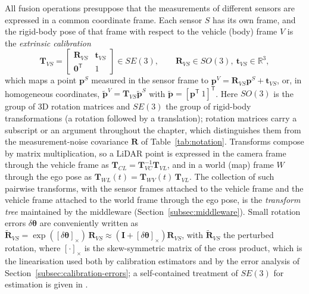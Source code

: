 \documentclass[graybox,envcountchap]{style/SNmono}
\begin{document}
All fusion operations presuppose that the measurements of different sensors are expressed in a common coordinate frame. Each sensor $S$ has its own frame, and the rigid-body pose of that frame with respect to the vehicle (body) frame $V$ is the \emph{extrinsic calibration}
\begin{equation}
\mathbf{T}_{V\!S}=
\begin{bmatrix}
\mathbf{R}_{V\!S} & \mathbf{t}_{V\!S}\\
\mathbf{0}^{\mathsf T} & 1
\end{bmatrix}\in SE(3),
\qquad
\mathbf{R}_{V\!S}\in SO(3),\ \mathbf{t}_{V\!S}\in\mathbb{R}^{3},
\label{eq:extrinsic-se3}
\end{equation}
which maps a point $\mathbf{p}^{S}$ measured in the sensor frame to $\mathbf{p}^{V}=\mathbf{R}_{V\!S}\mathbf{p}^{S}+\mathbf{t}_{V\!S}$, or, in homogeneous coordinates, $\tilde{\mathbf{p}}^{V}=\mathbf{T}_{V\!S}\tilde{\mathbf{p}}^{S}$ with $\tilde{\mathbf{p}}=[\mathbf{p}^{\mathsf T}\ 1]^{\mathsf T}$. Here $SO(3)$ is the group of 3D rotation matrices and $SE(3)$ the group of rigid-body transformations (a rotation followed by a translation); rotation matrices carry a subscript or an argument throughout the chapter, which distinguishes them from the measurement-noise covariance $\mathbf{R}$ of Table~\ref{tab:notation}. Transforms compose by matrix multiplication, so a LiDAR point is expressed in the camera frame through the vehicle frame as $\mathbf{T}_{C\!L}=\mathbf{T}_{V\!C}^{-1}\mathbf{T}_{V\!L}$, and in a world (map) frame $W$ through the ego pose as $\mathbf{T}_{W\!L}(t)=\mathbf{T}_{W\!V}(t)\,\mathbf{T}_{V\!L}$. The collection of such pairwise transforms, with the sensor frames attached to the vehicle frame and the vehicle frame attached to the world frame through the ego pose, is the \emph{transform tree} maintained by the middleware (Section~\ref{subsec:middleware}). Small rotation errors $\delta\boldsymbol{\theta}$ are conveniently written as $\widetilde{\mathbf{R}}_{V\!S}=\exp([\delta\boldsymbol{\theta}]_{\times})\,\mathbf{R}_{V\!S}\approx(\mathbf{I}+[\delta\boldsymbol{\theta}]_{\times})\mathbf{R}_{V\!S}$, with $\widetilde{\mathbf{R}}_{V\!S}$ the perturbed rotation, where $[\cdot]_{\times}$ is the skew-symmetric matrix of the cross product, which is the linearisation used both by calibration estimators and by the error analysis of Section~\ref{subsec:calibration-errors}; a self-contained treatment of $SE(3)$ for estimation is given in \cite{barfoot2017_state_estimation,sola2018_microlie}.
\end{document}
